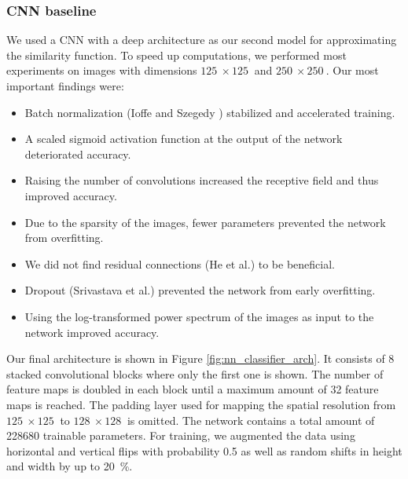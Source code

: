 \documentclass[10pt,conference,compsocconf]{IEEEtran}
\begin{document}
\subsubsection{CNN baseline} %
We used a CNN with a deep architecture as our second model for approximating the similarity function. To speed up computations, we performed most experiments on images with dimensions $\SI{125}{}\times\SI{125}{}$ and $\SI{250}{}\times\SI{250}{}$. Our most important findings were:

\begin{itemize}
\item Batch normalization (Ioffe and Szegedy \cite{BatchNorm}) stabilized and accelerated training.
\item A scaled sigmoid activation function at the output of the network deteriorated accuracy.
\item Raising the number of convolutions increased the receptive field and thus improved accuracy.
\item Due to the sparsity of the images, fewer parameters prevented the network from overfitting.
\item We did not find residual connections (He et al.\@ \cite{ResNet}) to be beneficial.
\item Dropout (Srivastava et al.\@ \cite{Dropout}) prevented the network from early overfitting.
\item Using the log-transformed power spectrum of the images as input to the network improved accuracy.
\end{itemize}

Our final architecture is shown in Figure \ref{fig:nn_classifier_arch}. It consists of 8 stacked convolutional blocks where only the first one is shown. The number of feature maps is doubled in each block until a maximum amount of \SI{32}{} feature maps is reached. The padding layer used for mapping the spatial resolution from $\SI{125}{}\times\SI{125}{}$ to $\SI{128}{}\times\SI{128}{}$ is omitted. The network contains a total amount of \SI{228680}{} trainable parameters. For training, we augmented the data using horizontal and vertical flips with probability \SI{0.5}{} as well as random shifts in height and width by up to \SI{20}{\percent}. %
\end{document}
